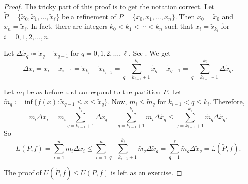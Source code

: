 \begin{proof}
The tricky part of this proof is to get the notation correct.
Let $\widetilde{P} = \{ \widetilde{x}_0, \widetilde{x}_1, \ldots,
\widetilde{x}_{\ell} \}$ be
a refinement of 
$P = \{ x_0, x_1, \ldots, x_n \}$.  Then
$x_0 = \widetilde{x}_0$ and 
$x_n = \widetilde{x}_{\ell}$.  In fact, there are integers
$k_0 < k_1 < \cdots < k_n$ such that $x_i = \widetilde{x}_{k_i}$ for
$i=0,1,2,\ldots,n$.

Let $\Delta \widetilde{x}_q \coloneqq \widetilde{x}_q - \widetilde{x}_{q-1}$ for
$q=0,1,2,\ldots,\ell$.
See .
We get 
\begin{equation*}
\Delta x_i
=
x_i - x_{i-1} =
\widetilde{x}_{k_i} - \widetilde{x}_{k_{i-1}} =
\sum_{q=k_{i-1}+1}^{k_i} 
\widetilde{x}_{q} - \widetilde{x}_{q-1}
=
\sum_{q=k_{i-1}+1}^{k_i} \Delta \widetilde{x}_q .
\end{equation*}
\begin{myfigureht}
\caption{Refinement of a subinterval.  Notice $\Delta x_i =
\Delta \widetilde{x}_{q-2} +
\Delta \widetilde{x}_{q-1} +
\Delta \widetilde{x}_{q}$,
and also
$k_{i-1}+1 = q-2$ and
$k_{i} = q$.\label{fig:refinement}}
\end{myfigureht}

Let $m_i$ be as before and correspond to the partition $P$.
Let $\widetilde{m}_q \coloneqq \inf \bigl\{ f(x) : \widetilde{x}_{q-1} \leq x \leq
\widetilde{x}_q \bigr\}$.
Now, $m_i \leq \widetilde{m}_q$ for $k_{i-1} < q \leq k_i$.  Therefore,
\begin{equation*}
m_i \Delta x_i
=
m_i \sum_{q=k_{i-1}+1}^{k_i} \Delta \widetilde{x}_q
=
\sum_{q=k_{i-1}+1}^{k_i} m_i \Delta \widetilde{x}_q
\leq
\sum_{q=k_{i-1}+1}^{k_i} \widetilde{m}_q \Delta \widetilde{x}_q .
\end{equation*}
So
\begin{equation*}
L(P,f) =
\sum_{i=1}^n m_i \Delta x_i
\leq
\sum_{i=1}^n \,
\sum_{q=k_{i-1}+1}^{k_i} \widetilde{m}_q \Delta \widetilde{x}_q
=
\sum_{q=1}^{\ell}
\widetilde{m}_q \Delta \widetilde{x}_q = L(\widetilde{P},f).
\end{equation*}

The proof of $U(\widetilde{P},f) \leq U(P,f)$ is left as an exercise.
\end{proof}

